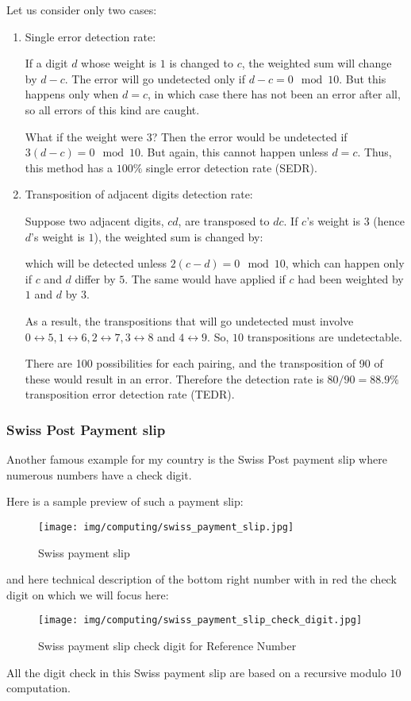 	Let us consider only two cases:
	\begin{enumerate}
		\item Single error detection rate:

		If a digit $d$ whose weight is $1$ is changed to $c$, the weighted sum will change by $d-c$. The error will go undetected only if $d-c=0 \mod 10$. But this happens only when $d=c$, in which case there has not been an error after all, so all errors of this kind are caught.

		What if the weight were $3$? Then the error would be undetected if $3(d-c)=0 \mod 10$. But again, this cannot happen unless $d=c$. Thus, this method has a $100\%$ single error detection rate (SEDR).

		\item Transposition of adjacent digits detection rate:

		Suppose two adjacent digits, $cd$, are transposed to $dc$. If $c$’s weight is $3$ (hence $d$’s weight is $1$), the weighted sum is changed by:
		
		which will be detected unless $2(c-d)=0 \mod 10$, which can happen only if $c$ and $d$ differ by $5$. The same would have applied if $c$ had been weighted by $1$ and $d$ by $3$.

		As a result, the transpositions that will go undetected must involve $0 \leftrightarrow 5, 1\leftrightarrow 6, 2 \leftrightarrow 7, 3 \leftrightarrow 8$ and $4 \leftrightarrow 9$. So, $10$ transpositions are undetectable.

		There are 100 possibilities for each pairing, and the transposition of 90 of these would result in an error. Therefore the detection rate is $ 80/90 = 88.9\% $ transposition error detection rate (TEDR).
	\end{enumerate}
	
	\subsubsection{Swiss Post Payment slip}
	Another famous example for my country is the Swiss Post payment slip where numerous numbers have a check digit.
	
	Here is a sample preview of such a payment slip:
	\begin{figure}[H]
		\centering
		\texttt{[image: img/computing/swiss\_payment\_slip.jpg]}
		\caption{Swiss payment slip}
	\end{figure}
	and here technical description of the bottom right number with in red the check digit on which we will focus here:
	\begin{figure}[H]
		\centering
		\texttt{[image: img/computing/swiss\_payment\_slip\_check\_digit.jpg]}
		\caption{Swiss payment slip check digit for Reference Number}
	\end{figure}
	All the digit check in this Swiss payment slip are based on a recursive modulo $10$ computation.
	

